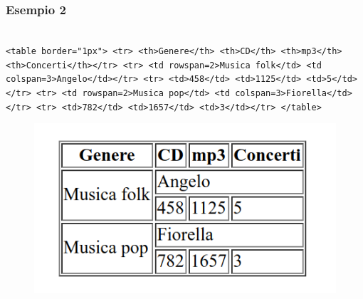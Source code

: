 \documentclass[]{beamer}
\begin{document}
\begin{frame}[fragile]
\frametitle{Esempio 2}

\begin{scriptsize}
\texttt{~\\
<table border="1px">\newline
<tr> <th>Genere</th> <th>CD</th> <th>mp3</th> <th>Concerti</th></tr>\newline
<tr> <td rowspan=2>Musica folk</td> <td colspan=3>Angelo</td></tr>\newline
<tr> <td>458</td> <td>1125</td> <td>5</td></tr>\newline
<tr> <td rowspan=2>Musica pop</td> <td colspan=3>Fiorella</td></tr>\newline
<tr> <td>782</td> <td>1657</td> <td>3</td></tr>\newline
</table>
}
\end{scriptsize}

\begin{figure}
\includegraphics[width=.5\columnwidth]{screenshots/tabella2.png}
\end{figure}

\end{frame}
\end{document}
